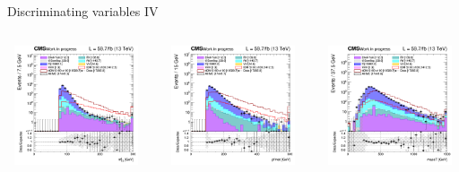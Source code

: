 \documentclass[8pt]{beamer}
\begin{document}
\begin{frame}{Discriminating variables IV}
\begin{columns}
\begin{column}{1.09\textwidth}
\begin{block}{}\end{block} \vspace{5pt}
\end{column}
\end{columns} \vspace{-5pt}
\begin{columns}
		\begin{column}{0.33\textwidth}
			\begin{center}
     			\includegraphics[width=1.0\textwidth, height=100pt]{figs/2018/SmearSR-ttDM-scalar100/log_cratio_topCR_ll_mt2ll.png}
    		\end{center}		
		\end{column} 
		\begin{column}{0.33\textwidth}
			\begin{center}
     			\includegraphics[width=1.0\textwidth, height=100pt]{figs/2018/SmearSR-ttDM-scalar100/log_cratio_topCR_ll_METcorrected_pt.png}
    		\end{center}		
		\end{column} 
		\begin{column}{0.33\textwidth}
			\begin{center}
     			\includegraphics[width=1.0\textwidth, height=100pt]{figs/2018/SmearSR-ttDM-scalar100/log_cratio_topCR_ll_massT.png}

\end{center}
\end{column}
\end{columns}
\end{frame}
\end{document}
